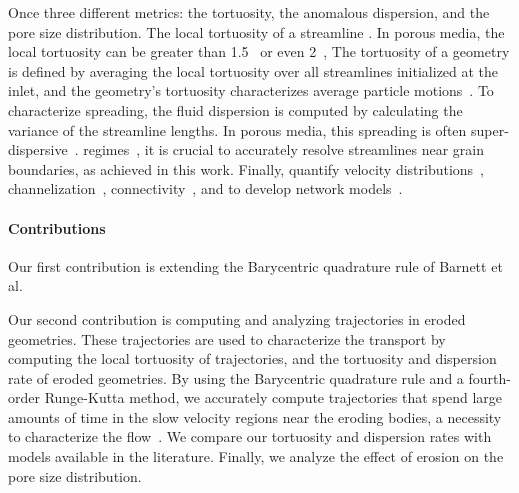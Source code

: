 \documentclass[preprint,10pt]{elsarticle}
\begin{document}
Once  three different metrics: the tortuosity, the anomalous dispersion, and the pore size distribution. 
The local tortuosity of a streamline .
In porous media, the local tortuosity can be greater than 1.5~\cite{kop-kat-tim1996, mat-kha-koz2008} or even 2~\cite{dud-koz-mat2011},  
The tortuosity of a geometry is defined by averaging the local tortuosity over all streamlines initialized at the inlet, and the geometry's tortuosity characterizes average particle motions~\cite{hak-com-den2019}.  To characterize spreading, the fluid dispersion is computed by calculating the variance of the streamline lengths. In porous media, this spreading is often
super-dispersive~\cite{kan-dea-nun-bij-blu-jua2014, cus-hu-den1995,
dea-leb-den-tar-bol-dav2013}. 
regimes~\cite{ber-sch2001}, it is crucial to accurately resolve  streamlines near grain boundaries, as achieved in this work.
Finally,  quantify velocity distributions~\cite{ali-par-wei-bre2017, dea-qua-bir-jua2018}, channelization~\cite{sie-ili-pri-riv-gua2019}, connectivity~\cite{knu-car2005, wes-blo-gra2001}, and to develop network models~\cite{bry-kin-mel1993, bry-mel-cad1993, bij-blu2006}. 

\paragraph{Contributions}
Our first contribution is extending the Barycentric quadrature rule of
Barnett et al.~\cite{bar-wu-vee2015} 

Our second contribution is computing and analyzing trajectories in
eroded geometries.  These trajectories are used to characterize the
transport by computing the local tortuosity of trajectories, and the
tortuosity and dispersion rate of eroded geometries. By using the
Barycentric quadrature rule and a fourth-order Runge-Kutta method, we
accurately compute trajectories that spend large amounts of time in the
slow velocity regions near the eroding bodies, a necessity to
characterize the flow~\cite{dea-leb-den-tar-bol-dav2013}.  We compare
our tortuosity and dispersion rates with models available in the
literature.  Finally, we analyze the effect of erosion on the pore size
distribution.
\end{document}
